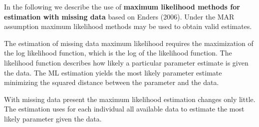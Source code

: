 In the following we describe the use of \textbf{maximum likelihood methods for estimation with missing data} based on Enders (2006). 
Under the MAR assumption maximum likelihood methods may be used to obtain valid estimates. \par
 The estimation of missing data maximum likelihood requires the maximization of the log likelihood function, which is the log of the likelihood function. The likelihood function describes how likely a particular parameter estimate is given the data. The ML estimation yields the most likely parameter estimate minimizing the squared distance between the parameter and the data. \par With missing data present the maximum likelihood estimation changes only little. The estimation uses for each individual all available data to estimate the most likely parameter given the data.  
